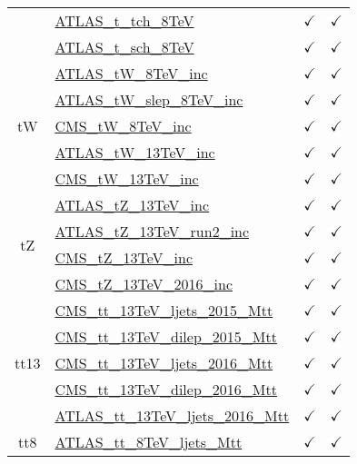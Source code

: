 \documentclass{article}
\begin{document}
\begin{table}[H]
\begin{tabular}{|c|l|c|c|}
 & \href{https://arxiv.org/abs/1702.02859}{ATLAS_t_tch_8TeV}  & $\checkmark$ & $\checkmark$\\ \cline{2-4}
 & \href{https://arxiv.org/abs/1511.05980}{ATLAS_t_sch_8TeV}  & $\checkmark$ & $\checkmark$
\\ \hline
\multirow{5}{*}{tW}
 & \href{https://arxiv.org/abs/1510.03752}{ATLAS_tW_8TeV_inc}  & $\checkmark$ & $\checkmark$\\ \cline{2-4}
 & \href{https://arxiv.org/abs/2007.01554}{ATLAS_tW_slep_8TeV_inc}  & $\checkmark$ & $\checkmark$\\ \cline{2-4}
 & \href{https://arxiv.org/abs/1401.2942}{CMS_tW_8TeV_inc}  & $\checkmark$ & $\checkmark$\\ \cline{2-4}
 & \href{https://arxiv.org/abs/1612.07231}{ATLAS_tW_13TeV_inc}  & $\checkmark$ & $\checkmark$\\ \cline{2-4}
 & \href{https://arxiv.org/abs/1805.07399}{CMS_tW_13TeV_inc}  & $\checkmark$ & $\checkmark$
\\ \hline
\multirow{4}{*}{tZ}
 & \href{https://arxiv.org/abs/1712.02825}{ATLAS_tZ_13TeV_inc}  & $\checkmark$ & $\checkmark$\\ \cline{2-4}
 & \href{https://arxiv.org/abs/2002.07546}{ATLAS_tZ_13TeV_run2_inc}  & $\checkmark$ & $\checkmark$\\ \cline{2-4}
 & \href{https://arxiv.org/abs/1712.02825}{CMS_tZ_13TeV_inc}  & $\checkmark$ & $\checkmark$\\ \cline{2-4}
 & \href{https://arxiv.org/abs/1812.05900}{CMS_tZ_13TeV_2016_inc}  & $\checkmark$ & $\checkmark$
\\ \hline
\multirow{5}{*}{tt13}
 & \href{https://arxiv.org/abs/1610.04191}{CMS_tt_13TeV_ljets_2015_Mtt}  & $\checkmark$ & $\checkmark$\\ \cline{2-4}
 & \href{https://arxiv.org/abs/1708.07638}{CMS_tt_13TeV_dilep_2015_Mtt}  & $\checkmark$ & $\checkmark$\\ \cline{2-4}
 & \href{https://arxiv.org/abs/1803.08856}{CMS_tt_13TeV_ljets_2016_Mtt}  & $\checkmark$ & $\checkmark$\\ \cline{2-4}
 & \href{https://arxiv.org/abs/1811.06625}{CMS_tt_13TeV_dilep_2016_Mtt}  & $\checkmark$ & $\checkmark$\\ \cline{2-4}
 & \href{https://arxiv.org/abs/1908.07305}{ATLAS_tt_13TeV_ljets_2016_Mtt}  & $\checkmark$ & $\checkmark$
\\ \hline
\multirow{4}{*}{tt8}
 & \href{https://arxiv.org/abs/1511.04716}{ATLAS_tt_8TeV_ljets_Mtt}  & $\checkmark$ & $\checkmark$\\ \cline{2-4}

\end{tabular}
\end{table}
\end{document}
